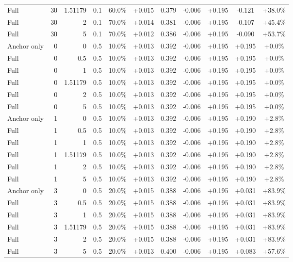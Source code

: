 \begin{table}[htbp]
\begin{tabular}{lrrrccccccc}
Full & 30 & 1.51179 & 0.1 & 60.0\% & +0.015 & 0.379 & -0.006 & +0.195 & -0.121 & +38.0\% \\
Full & 30 & 2 & 0.1 & 70.0\% & +0.014 & 0.381 & -0.006 & +0.195 & -0.107 & +45.4\% \\
Full & 30 & 5 & 0.1 & 70.0\% & +0.012 & 0.386 & -0.006 & +0.195 & -0.090 & +53.7\% \\
Anchor only & 0 & 0 & 0.5 & 10.0\% & +0.013 & 0.392 & -0.006 & +0.195 & +0.195 & +0.0\% \\
Full & 0 & 0.5 & 0.5 & 10.0\% & +0.013 & 0.392 & -0.006 & +0.195 & +0.195 & +0.0\% \\
Full & 0 & 1 & 0.5 & 10.0\% & +0.013 & 0.392 & -0.006 & +0.195 & +0.195 & +0.0\% \\
Full & 0 & 1.51179 & 0.5 & 10.0\% & +0.013 & 0.392 & -0.006 & +0.195 & +0.195 & +0.0\% \\
Full & 0 & 2 & 0.5 & 10.0\% & +0.013 & 0.392 & -0.006 & +0.195 & +0.195 & +0.0\% \\
Full & 0 & 5 & 0.5 & 10.0\% & +0.013 & 0.392 & -0.006 & +0.195 & +0.195 & +0.0\% \\
Anchor only & 1 & 0 & 0.5 & 10.0\% & +0.013 & 0.392 & -0.006 & +0.195 & +0.190 & +2.8\% \\
Full & 1 & 0.5 & 0.5 & 10.0\% & +0.013 & 0.392 & -0.006 & +0.195 & +0.190 & +2.8\% \\
Full & 1 & 1 & 0.5 & 10.0\% & +0.013 & 0.392 & -0.006 & +0.195 & +0.190 & +2.8\% \\
Full & 1 & 1.51179 & 0.5 & 10.0\% & +0.013 & 0.392 & -0.006 & +0.195 & +0.190 & +2.8\% \\
Full & 1 & 2 & 0.5 & 10.0\% & +0.013 & 0.392 & -0.006 & +0.195 & +0.190 & +2.8\% \\
Full & 1 & 5 & 0.5 & 10.0\% & +0.013 & 0.392 & -0.006 & +0.195 & +0.190 & +2.8\% \\
Anchor only & 3 & 0 & 0.5 & 20.0\% & +0.015 & 0.388 & -0.006 & +0.195 & +0.031 & +83.9\% \\
Full & 3 & 0.5 & 0.5 & 20.0\% & +0.015 & 0.388 & -0.006 & +0.195 & +0.031 & +83.9\% \\
Full & 3 & 1 & 0.5 & 20.0\% & +0.015 & 0.388 & -0.006 & +0.195 & +0.031 & +83.9\% \\
Full & 3 & 1.51179 & 0.5 & 20.0\% & +0.015 & 0.388 & -0.006 & +0.195 & +0.031 & +83.9\% \\
Full & 3 & 2 & 0.5 & 20.0\% & +0.015 & 0.388 & -0.006 & +0.195 & +0.031 & +83.9\% \\
Full & 3 & 5 & 0.5 & 20.0\% & +0.013 & 0.400 & -0.006 & +0.195 & +0.083 & +57.6\% \\

\end{tabular}
\end{table}

